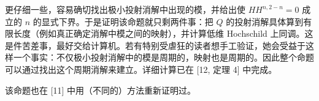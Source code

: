 
更仔细一些，容易确切找出极小投射消解中出现的模，并给出使 $HH^{n,2-n}=0$ 成立的 $n$ 的显式下界。于是证明该命题就只剩两件事：把 $Q$ 的投射消解具体算到有限长度（例如真正确定消解中模之间的映射），并计算低维 Hochschild 上同调。这是件苦差事，最好交给计算机。若有特别受虐狂的读者想手工验证，她会受益于这样一个事实：不仅极小投射消解中的模是周期的，映射也是周期的。因此整个命题可以通过找出这个周期消解来建立。详细计算已在 [12, 定理 4] 中完成。

该命题也在 [11] 中用（不同的）方法重新证明过。

